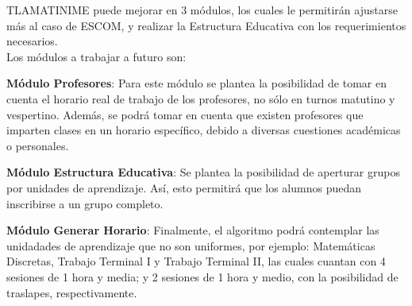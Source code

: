 \label{sec:trabajoFuturo}

TLAMATINIME puede mejorar en 3 módulos, los cuales le permitirán ajustarse más al caso de ESCOM, y realizar la Estructura Educativa con los requerimientos necesarios. \\

Los módulos a trabajar a futuro son: \\

\begin{Titemize}
	\Titem \textbf{Módulo Profesores}: Para este módulo se plantea la posibilidad de tomar en cuenta el horario real de trabajo de los profesores, no sólo en turnos matutino y vespertino. Además, se podrá tomar en cuenta que existen profesores que imparten clases en un horario específico, debido a diversas cuestiones académicas o personales.
	
	\Titem \textbf{Módulo Estructura Educativa}: Se plantea la posibilidad de aperturar grupos por unidades de aprendizaje. Así, esto permitirá que los alumnos puedan inscribirse a un grupo completo.
	
	\Titem \textbf{Módulo Generar Horario}: Finalmente, el algoritmo podrá contemplar las unidadades de aprendizaje que no son uniformes, por ejemplo: Matemáticas Discretas, Trabajo Terminal I y Trabajo Terminal II, las cuales cuantan con 4 sesiones de 1 hora y media; y 2 sesiones de 1 hora y medio, con la posibilidad de traslapes, respectivamente.
	
\end{Titemize}